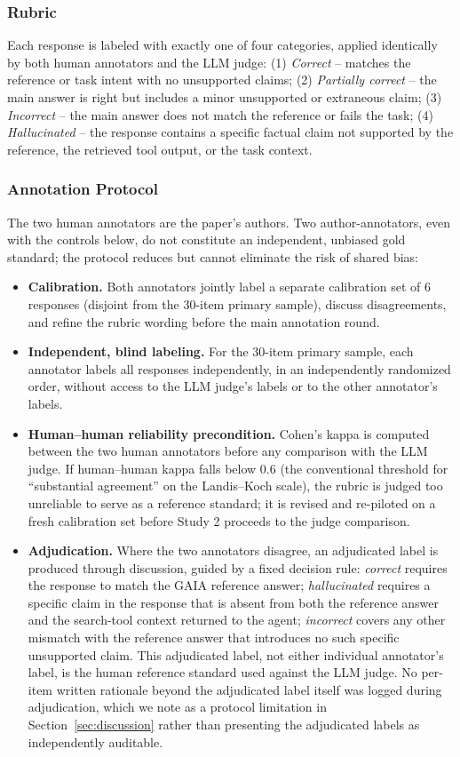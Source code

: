\documentclass[conference]{IEEEtran}
\begin{document}
\subsubsection{Rubric}
Each response is labeled with exactly one of four categories, applied identically by both human annotators and the LLM judge: (1) \emph{Correct} -- matches the reference or task intent with no unsupported claims; (2) \emph{Partially correct} -- the main answer is right but includes a minor unsupported or extraneous claim; (3) \emph{Incorrect} -- the main answer does not match the reference or fails the task; (4) \emph{Hallucinated} -- the response contains a specific factual claim not supported by the reference, the retrieved tool output, or the task context.

\subsubsection{Annotation Protocol}
The two human annotators are the paper's authors. Two author-annotators, even with the controls below, do not constitute an independent, unbiased gold standard; the protocol reduces but cannot eliminate the risk of shared bias:
\begin{itemize}
\item \textbf{Calibration.} Both annotators jointly label a separate calibration set of 6 responses (disjoint from the 30-item primary sample), discuss disagreements, and refine the rubric wording before the main annotation round.
\item \textbf{Independent, blind labeling.} For the 30-item primary sample, each annotator labels all responses independently, in an independently randomized order, without access to the LLM judge's labels or to the other annotator's labels.
\item \textbf{Human--human reliability precondition.} Cohen's kappa is computed between the two human annotators before any comparison with the LLM judge. If human--human kappa falls below 0.6 (the conventional threshold for ``substantial agreement'' on the Landis--Koch scale), the rubric is judged too unreliable to serve as a reference standard; it is revised and re-piloted on a fresh calibration set before Study 2 proceeds to the judge comparison.
\item \textbf{Adjudication.} Where the two annotators disagree, an adjudicated label is produced through discussion, guided by a fixed decision rule: \emph{correct} requires the response to match the GAIA reference answer; \emph{hallucinated} requires a specific claim in the response that is absent from both the reference answer and the search-tool context returned to the agent; \emph{incorrect} covers any other mismatch with the reference answer that introduces no such specific unsupported claim. This adjudicated label, not either individual annotator's label, is the human reference standard used against the LLM judge. No per-item written rationale beyond the adjudicated label itself was logged during adjudication, which we note as a protocol limitation in Section~\ref{sec:discussion} rather than presenting the adjudicated labels as independently auditable.
\end{itemize}
\end{document}

